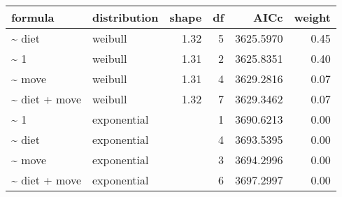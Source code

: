 \begin{table}[ht]
\centering
\begin{tabular}{llrrrr}
 formula & distribution & shape & df & AICc & weight \\ 
  \hline
\~{} diet & weibull & 1.32 & 5 & 3625.5970 & 0.45 \\ 
  \~{} 1 & weibull & 1.31 & 2 & 3625.8351 & 0.40 \\ 
  \~{} move & weibull & 1.31 & 4 & 3629.2816 & 0.07 \\ 
  \~{} diet + move & weibull & 1.32 & 7 & 3629.3462 & 0.07 \\ 
  \~{} 1 & exponential &  & 1 & 3690.6213 & 0.00 \\ 
  \~{} diet & exponential &  & 4 & 3693.5395 & 0.00 \\ 
  \~{} move & exponential &  & 3 & 3694.2996 & 0.00 \\ 
  \~{} diet + move & exponential &  & 6 & 3697.2997 & 0.00 \\ 
  \end{tabular}
\label{tab:erg}
\end{table}
